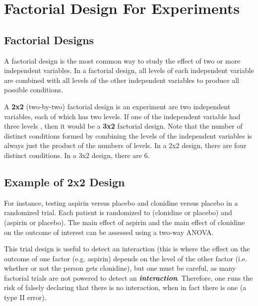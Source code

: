 \documentclass[12pt]{article}
\begin{document}
\section*{Factorial Design For Experiments}


\subsection*{Factorial Designs}

A factorial design is the most common way to study the effect of two or more independent variables.   In a factorial design, all levels of each independent variable are combined with all levels of the other independent variables to produce all possible conditions.  


A \textbf{2x2} (two-by-two) factorial design is an experiment are two independent variables, each of which has two levels.  If one of the independent variable had three levels , then it would be a \textbf{3x2} factorial design.  Note that the number of distinct conditions formed by combining the levels of the independent variables is always just the product of the numbers of levels.  In a 2x2 design, there are four distinct conditions.  In a 3x2 design, there are 6.

\subsection*{Example of 2x2 Design}
For instance, testing aspirin versus placebo and clonidine versus placebo in a randomized trial. Each patient is randomized to (clonidine or placebo) and (aspirin or placebo). The main effect of aspirin and the main effect of clonidine on the outcome of interest can be assessed using a two-way ANOVA.

This trial design is useful to detect an interaction (this is where the effect on the outcome of one factor (e.g. aspirin) depends on the level of the other factor (i.e. whether or not the person gets clonidine), but one must be careful, as many factorial trials are not powered to detect an \textit{\textbf{interaction}}. Therefore, one runs the risk of falsely declaring that there is no interaction, when in fact there is one (a type II error).
\end{document}
